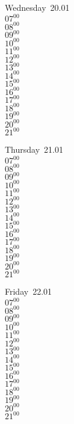 \documentclass[11pt,a4paper]{book}\usepackage[]{graphicx}\usepackage[]{color}
\begin{document}
\begin{weekdaybox}
  Wednesday~20.01\\
  { 
  \vfill
  $07^{00}$\\
$08^{00}$\\
$09^{00}$\\
$10^{00}$\\
$11^{00}$\\
$12^{00}$\\
$13^{00}$\\
$14^{00}$\\
$15^{00}$\\
$16^{00}$\\
$17^{00}$\\
$18^{00}$\\
$19^{00}$\\
$20^{00}$\\
$21^{00}$\\
  }
\end{weekdaybox}
\clearpage
\begin{headerbox}
\end{headerbox}
\begin{weekdaybox}
  Thursday~21.01\\
  { 
  \vfill
  $07^{00}$\\
$08^{00}$\\
$09^{00}$\\
$10^{00}$\\
$11^{00}$\\
$12^{00}$\\
$13^{00}$\\
$14^{00}$\\
$15^{00}$\\
$16^{00}$\\
$17^{00}$\\
$18^{00}$\\
$19^{00}$\\
$20^{00}$\\
$21^{00}$\\
  }
\end{weekdaybox} 
\begin{weekdaybox}
  Friday~22.01\\
  { 
  \vfill
  $07^{00}$\\
$08^{00}$\\
$09^{00}$\\
$10^{00}$\\
$11^{00}$\\
$12^{00}$\\
$13^{00}$\\
$14^{00}$\\
$15^{00}$\\
$16^{00}$\\
$17^{00}$\\
$18^{00}$\\
$19^{00}$\\
$20^{00}$\\
$21^{00}$\\
  }
\end{weekdaybox}
\end{document}
